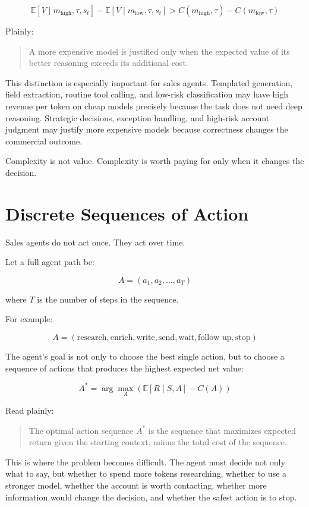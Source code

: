 \documentclass[12pt]{article}
\begin{document}
\[
\mathbb{E}[V \mid m_{\text{high}}, \tau, s_t]
-
\mathbb{E}[V \mid m_{\text{low}}, \tau, s_t]
>
C(m_{\text{high}}, \tau)
-
C(m_{\text{low}}, \tau)
\]

Plainly:

\begin{quote}
    A more expensive model is justified only when the expected value of its
    better reasoning exceeds its additional cost.
\end{quote}

This distinction is especially important for sales agents. Templated generation,
field extraction, routine tool calling, and low-risk classification may have
high revenue per token on cheap models precisely because the task does not need
deep reasoning. Strategic decisions, exception handling, and high-risk account
judgment may justify more expensive models because correctness changes the
commercial outcome.

Complexity is not value. Complexity is worth paying for only when it changes the
decision.

\section{Discrete Sequences of Action}

Sales agents do not act once. They act over time.

Let a full agent path be:

\[
A = (a_1, a_2, \ldots, a_T)
\]

where \(T\) is the number of steps in the sequence.

For example:

\[
A =
(
\text{research},
\text{enrich},
\text{write},
\text{send},
\text{wait},
\text{follow up},
\text{stop}
)
\]

The agent's goal is not only to choose the best single action, but to choose a
sequence of actions that produces the highest expected net value:

\[
A^*
=
\arg\max_{A}
\left(
\mathbb{E}[R \mid S, A]
-
C(A)
\right)
\]

Read plainly:

\begin{quote}
    The optimal action sequence \(A^*\) is the sequence that maximizes expected
    return given the starting context, minus the total cost of the sequence.
\end{quote}

This is where the problem becomes difficult. The agent must decide not only what
to say, but whether to spend more tokens researching, whether to use a stronger
model, whether the account is worth contacting, whether more information would
change the decision, and whether the safest action is to stop.
\end{document}
